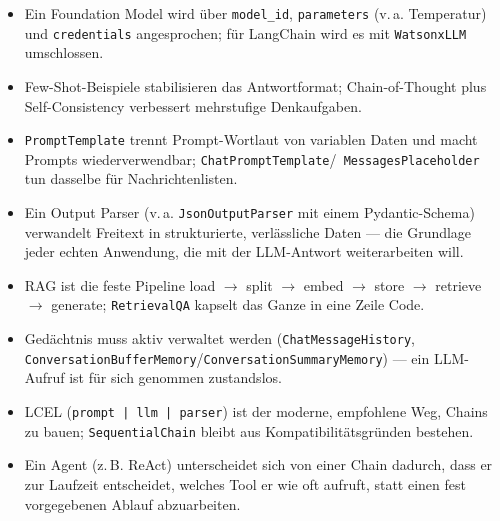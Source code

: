 \begin{merke}
\begin{itemize}[leftmargin=1.2em]
    \item Ein Foundation Model wird über \texttt{model\_id}, \texttt{parameters}
          (v.\,a. Temperatur) und \texttt{credentials} angesprochen; für LangChain wird es
          mit \texttt{WatsonxLLM} umschlossen.
    \item Few-Shot-Beispiele stabilisieren das Antwortformat; Chain-of-Thought plus
          Self-Consistency verbessert mehrstufige Denkaufgaben.
    \item \texttt{PromptTemplate} trennt Prompt-Wortlaut von variablen Daten und macht
          Prompts wiederverwendbar; \texttt{ChatPromptTemplate}/\texttt{
          MessagesPlaceholder} tun dasselbe für Nachrichtenlisten.
    \item Ein Output Parser (v.\,a. \texttt{JsonOutputParser} mit einem Pydantic-Schema)
          verwandelt Freitext in strukturierte, verlässliche Daten --- die Grundlage
          jeder echten Anwendung, die mit der LLM-Antwort weiterarbeiten will.
    \item RAG ist die feste Pipeline load $\rightarrow$ split $\rightarrow$ embed
          $\rightarrow$ store $\rightarrow$ retrieve $\rightarrow$ generate;
          \texttt{RetrievalQA} kapselt das Ganze in eine Zeile Code.
    \item Gedächtnis muss aktiv verwaltet werden (\texttt{ChatMessageHistory},
          \texttt{ConversationBufferMemory}/\texttt{ConversationSummaryMemory}) --- ein
          LLM-Aufruf ist für sich genommen zustandslos.
    \item LCEL (\texttt{prompt | llm | parser}) ist der moderne, empfohlene Weg, Chains
          zu bauen; \texttt{SequentialChain} bleibt aus Kompatibilitätsgründen bestehen.
    \item Ein Agent (z.\,B. ReAct) unterscheidet sich von einer Chain dadurch, dass er
          zur Laufzeit entscheidet, welches Tool er wie oft aufruft, statt einen fest
          vorgegebenen Ablauf abzuarbeiten.
\end{itemize}
\end{merke}
